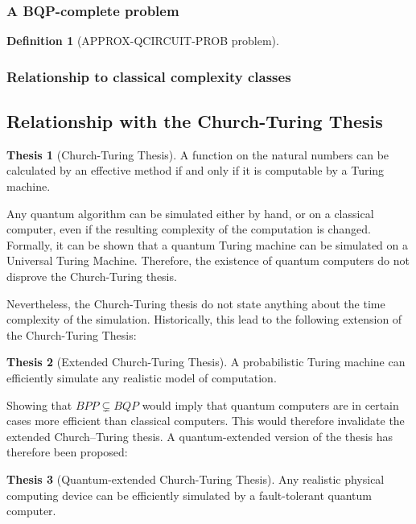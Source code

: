 \documentclass[12pt,a4paper]{article}
\theoremstyle{plain}
\theoremstyle{definition}
\newtheorem*{definition}{Definition}
\newtheorem*{thesis}{Thesis}
\begin{document}
\subsubsection{A BQP-complete problem}
\begin{definition}[APPROX-QCIRCUIT-PROB problem]
    
\end{definition}

\subsubsection{Relationship to classical complexity classes}


\subsection{Relationship with the Church-Turing Thesis}
\begin{thesis}[Church-Turing Thesis]
    A function on the natural numbers can be calculated by an effective method if and only if it is computable by a Turing machine.
\end{thesis}

Any quantum algorithm can be simulated either by hand, or on a classical computer, even if the resulting complexity of the computation is changed. Formally, it can be shown that a quantum Turing machine can be simulated on a Universal Turing Machine. Therefore, the existence of quantum computers do not disprove the Church-Turing thesis.

Nevertheless, the Church-Turing thesis do not state anything about the time complexity of the simulation. Historically, this lead to the following extension of the Church-Turing Thesis:
\begin{thesis}[Extended Church-Turing Thesis]
    A probabilistic Turing machine can efficiently simulate any realistic model of computation.
\end{thesis}

Showing that $BPP \varsubsetneq BQP$ would imply that quantum computers are in certain cases more efficient than classical computers. This would therefore invalidate the extended Church–Turing thesis. A quantum-extended version of the thesis has therefore been proposed\cite{quantum-applied}:
\begin{thesis}[Quantum-extended Church-Turing Thesis]
    Any realistic physical computing device can be efficiently simulated by a fault-tolerant quantum computer.
\end{thesis}
\end{document}
